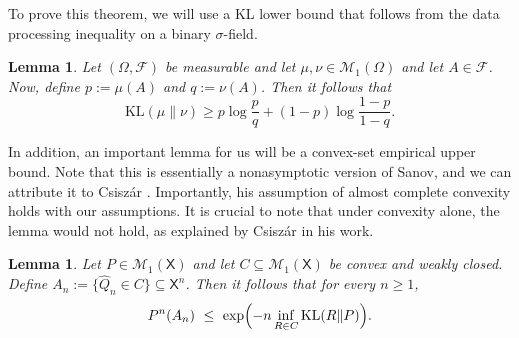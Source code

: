 \documentclass[11pt]{article}
\newcommand{\KL}{\mathrm{KL}}
\newcommand{\X}{\mathsf{X}}
\newtheorem{lemma}[theorem]{Lemma}
\theoremstyle{definition}
\theoremstyle{definition}
\begin{document}
To prove this theorem, we will use a KL lower bound that follows from the data processing inequality on a binary $\sigma$-field. 
\begin{lemma}\label{lem:binary-dpi}
Let $(\Omega, \mathcal{F})$ be measurable and let $\mu, \nu\in\mathcal{M}_1(\Omega)$ and let $A\in\mathcal{F}$. Now, define $p:=\mu(A)$ and $q:=\nu(A)$. Then it follows that
\[
\KL(\mu\|\nu)\ge p\log\frac{p}{q}+(1-p)\log\frac{1-p}{1-q}.
\]
\end{lemma}

In addition, an important lemma for us will be a convex-set empirical upper bound. Note that this is essentially a nonasymptotic version of Sanov, and we can attribute it to Csisz{\'a}r \cite{csiszar1984sanov}. Importantly, his assumption of almost complete convexity holds with our assumptions. It is crucial to note that under convexity alone, the lemma would not hold, as explained by Csisz{\'a}r in his work.

\begin{lemma}\label{lem:convex-empirical}
Let $P\in\mathcal M_1(\X)$ and let $C\subseteq\mathcal M_1(\X)$ be convex and weakly closed. Define $A_n:=\{\widehat Q_n\in C\}\subseteq \X^n$. Then it follows that for every $n\ge 1$,
\[
P^n(A_n)\ \le\ \exp\Bigl(-n\inf_{R\in C}\KL(R\|P)\Bigr).
\]
\end{lemma}
\end{document}
